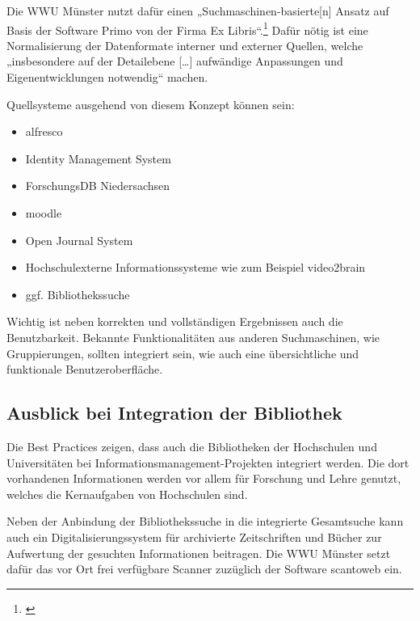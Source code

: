 Die WWU Münster nutzt dafür einen „Suchmaschinen-basierte[n] Ansatz auf Basis der Software Primo von der Firma Ex Libris“.\footnote{\cite{vogl_fortschritte_2012}} Dafür nötig ist eine Normalisierung der Datenformate interner und externer Quellen, welche „insbesondere auf der Detailebene […] aufwändige Anpassungen und Eigenentwicklungen notwendig“ machen.

Quellsysteme ausgehend von diesem Konzept können sein:
\begin{itemize}
	\item alfresco
	\item Identity Management System
	\item ForschungsDB Niedersachsen
	\item moodle
	\item Open Journal System
	\item Hochschulexterne Informationssysteme wie zum Beispiel video2brain
	\item ggf. Bibliothekssuche
\end{itemize}

Wichtig ist neben korrekten und vollständigen Ergebnissen auch die Benutzbarkeit. Bekannte Funktionalitäten aus anderen Suchmaschinen, wie Gruppierungen, sollten integriert sein, wie auch eine übersichtliche und funktionale Benutzeroberfläche.

\subsection{Ausblick bei Integration der Bibliothek}
Die Best Practices zeigen, dass auch die Bibliotheken der Hochschulen und Universitäten bei Informationsmanagement-Projekten integriert werden. Die dort vorhandenen Informationen werden vor allem für Forschung und Lehre genutzt, welches die Kernaufgaben von Hochschulen sind.

Neben der Anbindung der Bibliothekssuche in die integrierte Gesamtsuche kann auch ein Digitalisierungssystem für archivierte Zeitschriften und Bücher zur Aufwertung der gesuchten Informationen beitragen. Die WWU Münster setzt dafür das vor Ort frei verfügbare Scanner zuzüglich der Software scantoweb ein.



